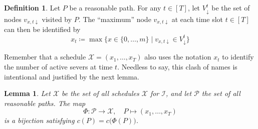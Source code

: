 \documentclass[hidelinks]{article}
\theoremstyle{plain}
\newtheorem{lem}[thm]{Lemma}
\theoremstyle{definition}
\newtheorem{defn}[thm]{Definition}
\theoremstyle{rem}
\newcommand{\mx}{\mathcal{X}}
\newcommand{\inp}{\mathcal{I}}
\newcommand{\costs}{c}
\newcommand{\fromto}[2]{\{#1,\ldots,#2\}}
\begin{document}
\begin{defn}
Let $P$ be a reasonable path. For any $t\in[T]$, let $V_\downarrow^t$ be the set of nodes $v_{x,t\downarrow}$ visited by $P$. The ``maximum'' node $v_{x,t\downarrow}$ at each time slot $t\in[T]$ can then be identified by
\begin{equation*}
	x_t\coloneqq\max\bigl\{x\in\fromto{0}{m}\mid v_{x,t\downarrow}\in V_\downarrow^t\bigr\}
\end{equation*}
\end{defn}
Remember that a schedule $\mx=(x_1,\ldots,x_T)$ also uses the notation $x_t$ to identify the number of active severs at time $t$. Needless to say, this clash of names is intentional and justified by the next lemma.
\begin{lem}\label{lem_sched_path_pseudo_lin}
Let $\bm{\mx}$ be the set of all schedules $\mx$ for $\inp$, and let $\bm{\mathcal{P}}$ the set of all reasonable paths. The map
\begin{equation*}\label{prop_reasn_paths_identify}
	\Phi:\bm{\mathcal{P}}\rightarrow\bm{\mx},\quad P\mapsto (x_1,\ldots,x_T)
\end{equation*}
is a bijection satisfying $\costs(P)=\costs\bigl(\Phi(P)\bigr)$.
\end{lem}
\end{document}
